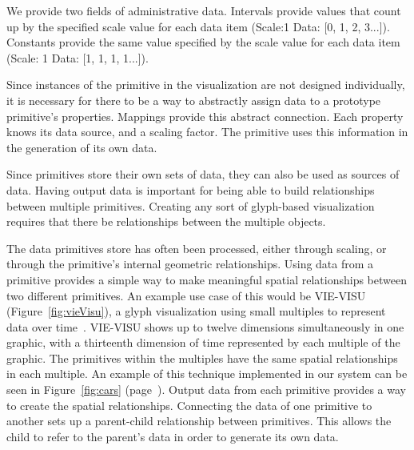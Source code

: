 We provide two fields of administrative data.
Intervals provide values that count up by the specified scale value for each data item (Scale:1 Data: [0, 1, 2, 3...]).
Constants provide the same value specified by the scale value for each data item (Scale: 1 Data: [1, 1, 1, 1...]).

\label{mappings}

Since instances of the primitive in the visualization are not designed individually, it is necessary for there to be a way to abstractly assign data to a prototype primitive's properties.
Mappings provide this abstract connection.
Each property knows its data source, and a scaling factor.
The primitive uses this information in the generation of its own data.

\label{connections}

Since primitives store their own sets of data, they can also be used as sources of data.
Having output data is important for being able to build relationships between multiple primitives.
Creating any sort of glyph-based visualization requires that there be relationships between the multiple objects.

The data primitives store has often been processed, either through scaling, or through the primitive's internal geometric relationships.
Using data from a primitive provides a simple way to make meaningful spatial relationships between two different primitives.
An example use case of this would be VIE-VISU (Figure~\ref{fig:vieVisu}), a glyph visualization using small multiples to represent data over time~\cite{Horn1998}.
VIE-VISU shows up to twelve dimensions simultaneously in one graphic, with a thirteenth dimension of time represented by each multiple of the graphic.
The primitives within the multiples have the same spatial relationships in each multiple.
An example of this technique implemented in our system can be seen in Figure~\ref{fig:cars} (page~\pageref{fig:cars}).
Output data from each primitive provides a way to create the spatial relationships.
Connecting the data of one primitive to another sets up a parent-child relationship between primitives.
This allows the child to refer to the parent's data in order to generate its own data.

